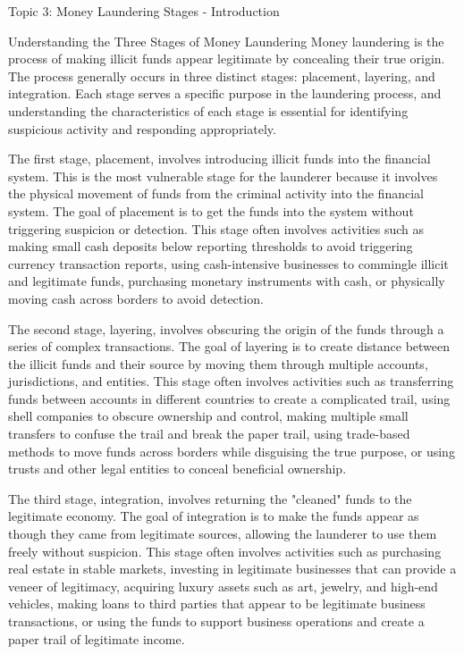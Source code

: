 \documentclass[8pt]{beamer}  %
\begin{document}
	\begin{frame}{Topic 3: Money Laundering Stages - Introduction}
		\begin{block}{\large Understanding the Three Stages of Money Laundering}
			Money laundering is the process of making illicit funds appear legitimate by concealing their true origin. The process generally occurs in three distinct stages: placement, layering, and integration. Each stage serves a specific purpose in the laundering process, and understanding the characteristics of each stage is essential for identifying suspicious activity and responding appropriately.
			
			The first stage, placement, involves introducing illicit funds into the financial system. This is the most vulnerable stage for the launderer because it involves the physical movement of funds from the criminal activity into the financial system. The goal of placement is to get the funds into the system without triggering suspicion or detection. This stage often involves activities such as making small cash deposits below reporting thresholds to avoid triggering currency transaction reports, using cash-intensive businesses to commingle illicit and legitimate funds, purchasing monetary instruments with cash, or physically moving cash across borders to avoid detection.
			
			The second stage, layering, involves obscuring the origin of the funds through a series of complex transactions. The goal of layering is to create distance between the illicit funds and their source by moving them through multiple accounts, jurisdictions, and entities. This stage often involves activities such as transferring funds between accounts in different countries to create a complicated trail, using shell companies to obscure ownership and control, making multiple small transfers to confuse the trail and break the paper trail, using trade-based methods to move funds across borders while disguising the true purpose, or using trusts and other legal entities to conceal beneficial ownership.
			
			The third stage, integration, involves returning the "cleaned" funds to the legitimate economy. The goal of integration is to make the funds appear as though they came from legitimate sources, allowing the launderer to use them freely without suspicion. This stage often involves activities such as purchasing real estate in stable markets, investing in legitimate businesses that can provide a veneer of legitimacy, acquiring luxury assets such as art, jewelry, and high-end vehicles, making loans to third parties that appear to be legitimate business transactions, or using the funds to support business operations and create a paper trail of legitimate income.
		\end{block}
		

\end{frame}
\end{document}
